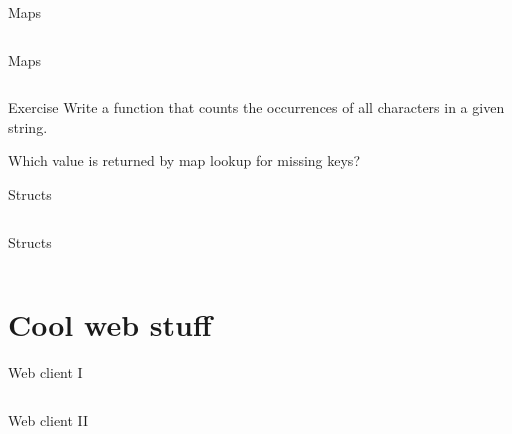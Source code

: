 \documentclass[10pt]{beamer}
\begin{document}
	
	\begin{frame}[t,fragile]{Maps}
		\inputminted{go}{code/07_maps.go}
	\end{frame}
			
	
	\begin{frame}[t,fragile]{Maps}
		\inputminted{go}{code/07b_maps.go}
	\end{frame}
	
	
	\begin{frame}[fragile]{Exercise}
		Write a function that counts the occurrences of all characters in a given string.
	
		Which value is returned by map lookup for missing keys?
	\end{frame}
	
	
	\begin{frame}[t,fragile]{Structs}
		\inputminted{go}{code/08_structs.go}
	\end{frame}
		
	
	\begin{frame}[t,fragile]{Structs}
		\inputminted{go}{code/09_structs.go}
	\end{frame}

	
	\section{Cool web stuff}
			
	
	\begin{frame}[t,fragile]{Web client I}
		\inputminted[fontsize=\footnotesize]{go}{code/10_xkcd.go}
	\end{frame}
				
	
	\begin{frame}[t,fragile]{Web client II}
		\inputminted{go}{code/10b_xkcd.go}
	\end{frame}
	
\end{document}
